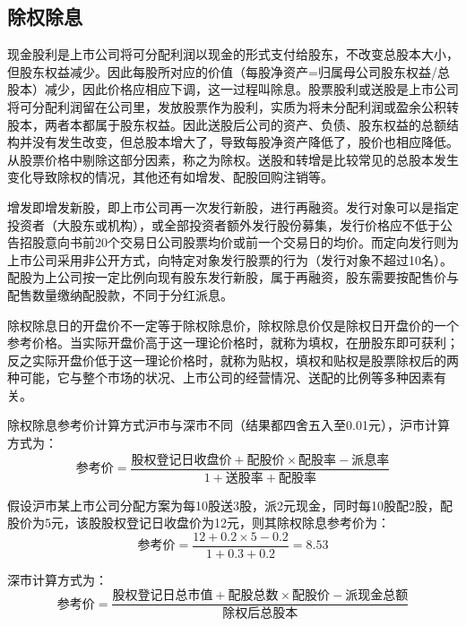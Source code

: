 \documentclass[11pt]{article}
\begin{document}
\begin{appendices}
\subsection*{除权除息}

现金股利是上市公司将可分配利润以现金的形式支付给股东，不改变总股本大小，但股东权益减少。因此每股所对应的价值（每股净资产=归属母公司股东权益/总股本）减少，因此价格应相应下调，这一过程叫除息。股票股利或送股是上市公司将可分配利润留在公司里，发放股票作为股利，实质为将未分配利润或盈余公积转股本，两者本都属于股东权益。因此送股后公司的资产、负债、股东权益的总额结构并没有发生改变，但总股本增大了，导致每股净资产降低了，股价也相应降低。从股票价格中剔除这部分因素，称之为除权。送股和转增是比较常见的总股本发生变化导致除权的情况，其他还有如增发、配股回购注销等。

增发即增发新股，即上市公司再一次发行新股，进行再融资。发行对象可以是指定投资者（大股东或机构），或全部投资者额外发行股份募集，发行价格应不低于公告招股意向书前20个交易日公司股票均价或前一个交易日的均价。而定向发行则为上市公司采用非公开方式，向特定对象发行股票的行为（发行对象不超过10名）。配股为上公司按一定比例向现有股东发行新股，属于再融资，股东需要按配售价与配售数量缴纳配股款，不同于分红派息。

除权除息日的开盘价不一定等于除权除息价，除权除息价仅是除权日开盘价的一个参考价格。当实际开盘价高于这一理论价格时，就称为填权，在册股东即可获利；反之实际开盘价低于这一理论价格时，就称为贴权，填权和贴权是股票除权后的两种可能，它与整个市场的状况、上市公司的经营情况、送配的比例等多种因素有关。

除权除息参考价计算方式沪市与深市不同（结果都四舍五入至0.01元），沪市计算方式为：
\begin{equation*}
    \text{参考价} = \frac{\text{股权登记日收盘价} + \text{配股价} \times \text{配股率} - \text{派息率}}{1 + \text{送股率} + \text{配股率}}
\end{equation*}

\begin{example}
    假设沪市某上市公司分配方案为每10股送3股，派2元现金，同时每10股配2股，配股价为5元，该股股权登记日收盘价为12元，则其除权除息参考价为：
    \begin{equation*}
        \text{参考价} = \frac{12 + 0.2\times 5 - 0.2}{1 + 0.3 + 0.2} = 8.53
    \end{equation*}
\end{example}

深市计算方式为：
\begin{equation*}
    \text{参考价} = \frac{\text{股权登记日总市值} + \text{配股总数}\times \text{配股价} - \text{派现金总额}}{\text{除权后总股本}}
\end{equation*}


\end{appendices}
\end{document}
